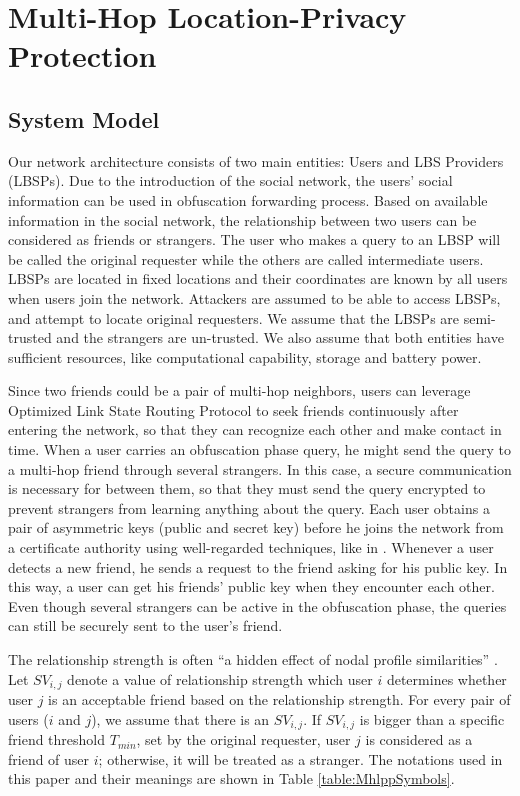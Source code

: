 \chapter {Multi-Hop Location-Privacy Protection}
\label{C_MHLPP}

\section{ System Model}

\noindent Our network architecture consists of two main entities: Users and LBS Providers (LBSPs). Due to the introduction of the social network, the users' social information can be used in obfuscation forwarding process. Based on available information in the social network, the relationship between two users can be considered as friends or strangers. The user who makes a query to an LBSP will be called the original requester while the others are called intermediate users. LBSPs are located in fixed locations and their coordinates are known by all users when users join the network. Attackers are assumed to be able to access LBSPs, and attempt to locate original requesters. We assume that the LBSPs are semi-trusted and the strangers are un-trusted. We also assume that both entities have sufficient resources, like computational capability, storage and battery power.

Since two friends could be a pair of multi-hop neighbors, users can leverage Optimized Link State Routing Protocol \cite{C29} to seek friends continuously after entering the network, so that they can recognize each other and make contact in time. When a user carries an obfuscation phase query, he might send the query to a multi-hop friend through several strangers. In this case, a secure communication is necessary for between them, so that they must send the query encrypted to prevent strangers from learning anything about the query. Each user obtains a pair of asymmetric keys (public and secret key) before he joins the network from a certificate authority using well-regarded techniques, like in \cite{C28}. Whenever a user detects a new friend, he sends a request to the friend asking for his public key. In this way, a user can get his friends' public key when they encounter each other. Even though several strangers can be active in the obfuscation phase, the queries can still be securely sent to the user's friend.

The relationship strength is often ``a hidden effect of nodal profile similarities'' \cite{C30}. Let ${SV}_{i,j}$ denote a value of relationship strength which user $i$ determines whether user $j$ is an acceptable friend based on the relationship strength. For every pair of users ($i$ and $j$), we assume that there is an ${SV}_{i,j}$. If ${SV}_{i,j}$ is bigger than a specific friend threshold $T_{min}$, set by the original requester, user $j$ is considered as a friend of user $i$; otherwise, it will be treated as a stranger. The notations used in this paper and their meanings are shown in Table \ref{table:MhlppSymbols}. 


